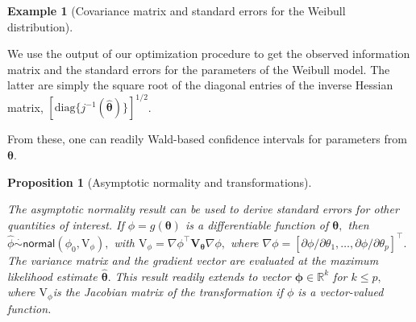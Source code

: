 \documentclass[
  11pt,
  letterpaper,
]{scrbook}
\newenvironment{Shaded}{\begin{snugshade}}{\end{snugshade}}
\newcommand{\CommentTok}[1]{\textcolor[rgb]{0.37,0.37,0.37}{#1}}
\newcommand{\FunctionTok}[1]{\textcolor[rgb]{0.28,0.35,0.67}{#1}}
\newcommand{\NormalTok}[1]{\textcolor[rgb]{0.00,0.23,0.31}{#1}}
\newcommand{\OtherTok}[1]{\textcolor[rgb]{0.00,0.23,0.31}{#1}}
\newcommand{\SpecialCharTok}[1]{\textcolor[rgb]{0.37,0.37,0.37}{#1}}
\theoremstyle{plain}
\newtheorem{proposition}{Proposition}[chapter]
\theoremstyle{definition}
\newtheorem{example}{Example}[chapter]
\theoremstyle{definition}
\theoremstyle{remark}
\begin{document}
\begin{example}[Covariance matrix and standard errors for the Weibull
distribution]\protect\hypertarget{exm-Weibull-se}{}\label{exm-Weibull-se}

We use the output of our optimization procedure to get the observed
information matrix and the standard errors for the parameters of the
Weibull model. The latter are simply the square root of the diagonal
entries of the inverse Hessian matrix,
\([\mathrm{diag}\{j^{-1}(\widehat{\boldsymbol{\theta}})\}]^{1/2}\).

\begin{Shaded}
\end{Shaded}

\end{example}

From these, one can readily Wald-based confidence intervals for
parameters from \(\boldsymbol{\theta}.\)

\begin{proposition}[Asymptotic normality and
transformations]\protect\hypertarget{prp-transformation}{}\label{prp-transformation}

The asymptotic normality result can be used to derive standard errors
for other quantities of interest. If \(\phi = g(\boldsymbol{\theta})\)
is a differentiable function of \(\boldsymbol{\theta},\) then
\(\widehat{\phi} \stackrel{\cdot}{\sim}\mathsf{normal}(\phi_0, \mathrm{V}_\phi),\)
with
\(\mathrm{V}_\phi = \nabla \phi^\top \mathbf{V}_{\boldsymbol{\theta}} \nabla \phi,\)
where
\(\nabla \phi=[\partial \phi/\partial \theta_1, \ldots, \partial \phi/\partial \theta_p]^\top.\)
The variance matrix and the gradient vector are evaluated at the maximum
likelihood estimate \(\widehat{\boldsymbol{\theta}}.\) This result
readily extends to vector \(\boldsymbol{\phi} \in \mathbb{R}^k\) for
\(k \leq p,\) where \(\mathrm{V}_\phi\)is the Jacobian matrix of the
transformation if \(\phi\) is a vector-valued function.

\end{proposition}
\end{document}
